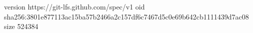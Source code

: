 version https://git-lfs.github.com/spec/v1
oid sha256:3801e877113ac15ba57b2466a2c157df6c7467d5c0e69b642cb1111439d7ac08
size 524384
